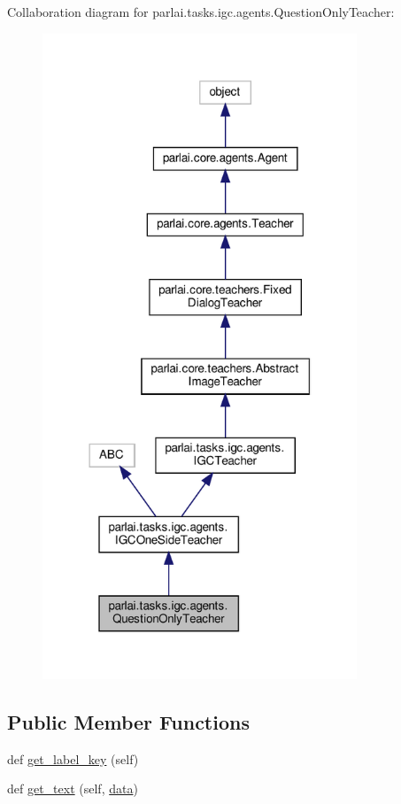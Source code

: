 Collaboration diagram for parlai.\+tasks.\+igc.\+agents.\+Question\+Only\+Teacher\+:
\nopagebreak
\begin{figure}[H]
\begin{center}
\leavevmode
\includegraphics[width=266pt]{df/d51/classparlai_1_1tasks_1_1igc_1_1agents_1_1QuestionOnlyTeacher__coll__graph}
\end{center}
\end{figure}
\subsection*{Public Member Functions}
\begin{DoxyCompactItemize}
\item 
def \hyperlink{classparlai_1_1tasks_1_1igc_1_1agents_1_1QuestionOnlyTeacher_acd12a3feb0851f9965a284380f74fa47}{get\+\_\+label\+\_\+key} (self)
\item 
def \hyperlink{classparlai_1_1tasks_1_1igc_1_1agents_1_1QuestionOnlyTeacher_a12cb85817128d65e4d8e29c29af1973f}{get\+\_\+text} (self, \hyperlink{classparlai_1_1tasks_1_1igc_1_1agents_1_1IGCTeacher_a23adac78cbb7a5761f66fea8809bcee4}{data})
\end{DoxyCompactItemize}
